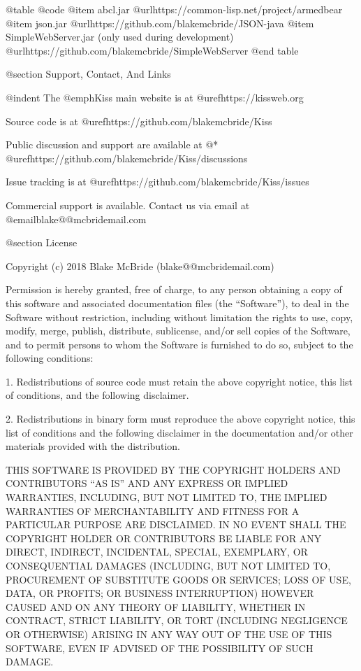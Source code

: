 @table @code
@item abcl.jar
@url{https://common-lisp.net/project/armedbear}
@item json.jar
@url{https://github.com/blakemcbride/JSON-java}
@item SimpleWebServer.jar (only used during development)
@url{https://github.com/blakemcbride/SimpleWebServer}
@end table

@section Support, Contact, And Links

@indent
The @emph{Kiss} main website is at @uref{https://kissweb.org}

Source code is at @uref{https://github.com/blakemcbride/Kiss}

Public discussion and support are available at @* 
@uref{https://github.com/blakemcbride/Kiss/discussions}

Issue tracking is at @uref{https://github.com/blakemcbride/Kiss/issues}

Commercial support is available.  Contact us via email at @email{blake@@mcbridemail.com}

@section License

Copyright (c) 2018 Blake McBride (blake@@mcbridemail.com)

Permission is hereby granted, free of charge, to any person obtaining
a copy of this software and associated documentation files (the
``Software''), to deal in the Software without restriction, including
without limitation the rights to use, copy, modify, merge, publish,
distribute, sublicense, and/or sell copies of the Software, and to
permit persons to whom the Software is furnished to do so, subject to
the following conditions:

1. Redistributions of source code must retain the above copyright
notice, this list of conditions, and the following disclaimer.

2. Redistributions in binary form must reproduce the above copyright
notice, this list of conditions and the following disclaimer in the
documentation and/or other materials provided with the distribution.

THIS SOFTWARE IS PROVIDED BY THE COPYRIGHT HOLDERS AND CONTRIBUTORS
``AS IS'' AND ANY EXPRESS OR IMPLIED WARRANTIES, INCLUDING, BUT NOT
LIMITED TO, THE IMPLIED WARRANTIES OF MERCHANTABILITY AND FITNESS FOR
A PARTICULAR PURPOSE ARE DISCLAIMED. IN NO EVENT SHALL THE COPYRIGHT
HOLDER OR CONTRIBUTORS BE LIABLE FOR ANY DIRECT, INDIRECT, INCIDENTAL,
SPECIAL, EXEMPLARY, OR CONSEQUENTIAL DAMAGES (INCLUDING, BUT NOT
LIMITED TO, PROCUREMENT OF SUBSTITUTE GOODS OR SERVICES; LOSS OF USE,
DATA, OR PROFITS; OR BUSINESS INTERRUPTION) HOWEVER CAUSED AND ON ANY
THEORY OF LIABILITY, WHETHER IN CONTRACT, STRICT LIABILITY, OR TORT
(INCLUDING NEGLIGENCE OR OTHERWISE) ARISING IN ANY WAY OUT OF THE USE
OF THIS SOFTWARE, EVEN IF ADVISED OF THE POSSIBILITY OF SUCH DAMAGE.

